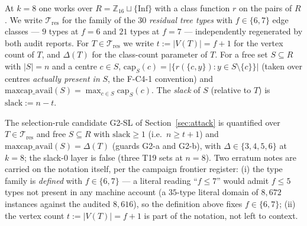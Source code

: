 \begin{definition}[residual tree types at $k=8$; corrected quantifier
domain]\label{def:tres}
At $k=8$ one works over $R=\mathbb{Z}_{16}\sqcup\{\mathrm{Inf}\}$ with a class function
$r$ on the pairs of $R$. We write $\mathcal{T}_{\mathrm{res}}$ for the family of the
$30$ \emph{residual tree types} with $f\in\{6,7\}$ edge classes --- $9$ types at $f=6$ and
$21$ types at $f=7$ --- independently regenerated by both audit reports. For
$T\in\mathcal{T}_{\mathrm{res}}$ we write
$t:=|V(T)|=f+1$ for the vertex count of $T$, and $\Delta(T)$ for the class-count parameter
of $T$. For a free set $S\subseteq R$ with $|S|=n$ and a centre $c\in S$,
$\mathrm{cap}_S(c)=|\{r(\{c,y\}):y\in S\setminus\{c\}\}|$ (taken over centres
\emph{actually present in} $S$, the F-C4-1 convention) and
$\mathrm{maxcap\_avail}(S)=\max_{c\in S}\mathrm{cap}_S(c)$. The \emph{slack} of $S$
(relative to $T$) is $\mathrm{slack}:=n-t$.
\end{definition}

\begin{remark}\label{rem:tresdomain}
The selection-rule candidate G2-SL of Section~\ref{sec:attack} is quantified over
$T\in\mathcal{T}_{\mathrm{res}}$ and free $S\subseteq R$ with $\mathrm{slack}\ge1$ (i.e.\
$n\ge t+1$) and $\mathrm{maxcap\_avail}(S)=\Delta(T)$ (guards G2-a and G2-b), with
$\Delta\in\{3,4,5,6\}$ at $k=8$; the slack-$0$ layer is false (three T19 sets at $n=8$).
Two erratum notes are carried on the notation itself, per the campaign frontier register:
(i) the type family is \emph{defined} with $f\in\{6,7\}$ --- a literal reading ``$f\le7$''
would admit $f\le5$ types not present in any machine account (a $35$-type literal domain of
$8{,}672$ instances against the audited $8{,}616$), so the definition above fixes
$f\in\{6,7\}$; (ii) the vertex count $t:=|V(T)|=f+1$ is part of the notation, not left to
context.
\end{remark}

